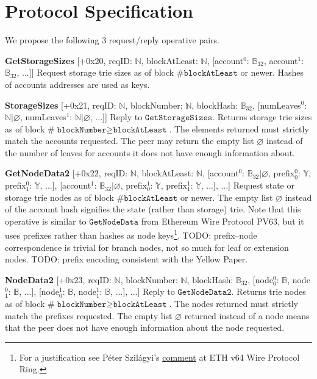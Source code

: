 \documentclass{amsart}
\begin{document}
\section{Protocol Specification}

We propose the following 3 request/reply operative pairs.

\textbf{GetStorageSizes} [+0x20, reqID: $\mathbb{N}$, blockAtLeast: $\mathbb{N}$,
[account$^0$: $\mathbb{B}_{32}$, account$^1$: $\mathbb{B}_{32}$, ...]]
Request storage trie sizes as of block \#$\texttt{blockAtLeast}$ or newer.
Hashes of accounts addresses are used as keys.

\textbf{StorageSizes} [+0x21, reqID: $\mathbb{N}$, blockNumber: $\mathbb{N}$, blockHash: $\mathbb{B}_{32}$,
[numLeaves$^0$: $\mathbb{N} | \varnothing$, numLeaves$^1$: $\mathbb{N} | \varnothing$, ...]]
Reply to $\texttt{GetStorageSizes}$.
Returns storage trie sizes as of block \#$\texttt{blockNumber} \geq \texttt{blockAtLeast}$.
The elements returned must strictly match the accounts requested.
The peer may return the empty list $\varnothing$ instead of the number of leaves for accounts it does not have enough information about.

\textbf{GetNodeData2} [+0x22, reqID: $\mathbb{N}$, blockAtLeast: $\mathbb{N}$,
[account$^0$: $\mathbb{B}_{32} | \varnothing$, prefix$^0_0$: $\mathbb{Y}$, prefix$^0_1$: $\mathbb{Y}$, ...],
[account$^1$: $\mathbb{B}_{32} | \varnothing$, prefix$^1_0$: $\mathbb{Y}$, prefix$^1_1$: $\mathbb{Y}$, ...],
...]
Request state or storage trie nodes as of block \#$\texttt{blockAtLeast}$ or newer.
The empty list $\varnothing$ instead of the account hash signifies the state (rather than storage) trie.
Note that this operative is similar to $\texttt{GetNodeData}$ from Ethereum Wire Protocol PV63,
but it uses prefixes rather than hashes as node keys\footnote{For
a justification see Péter Szilágyi's
\href{https://ethereum-magicians.org/t/forming-a-ring-eth-v64-wire-protocol-ring/2857/10}{comment}
at ETH v64 Wire Protocol Ring.}.
TODO: prefix--node correspondence is trivial for branch nodes, not so much for leaf or extension nodes.
TODO: prefix encoding consistent with the Yellow Paper.

\textbf{NodeData2} [+0x23, reqID: $\mathbb{N}$, blockNumber: $\mathbb{N}$, blockHash: $\mathbb{B}_{32}$,
[node$^0_0$: $\mathbb{B}$, node$^0_1$: $\mathbb{B}$, ...],
[node$^1_0$: $\mathbb{B}$, node$^1_1$: $\mathbb{B}$, ...],
...]
Reply to $\texttt{GetNodeData2}$.
Returns trie nodes as of block \#$\texttt{blockNumber} \geq \texttt{blockAtLeast}$.
The nodes returned must strictly match the prefixes requested.
The empty list $\varnothing$ returned instead of a node means that the peer does not have enough information about the node requested.
\end{document}
